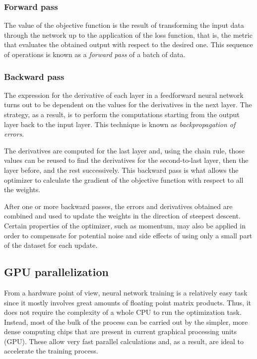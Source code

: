 \subsubsection{Forward pass}

The value of the objective function is the result of transforming the input data through the network up to the application of the loss function, that is, the metric that evaluates the obtained output with respect to the desired one. This sequence of operations is known as a \textit{forward pass} of a batch of data. 


\subsubsection{Backward pass}

The expression for the derivative of each layer in a feedforward neural network turns out to be dependent on the values for the derivatives in the next layer. The strategy, as a result, is to perform the computations starting from the output layer back to the input layer. This technique is known as \textit{backpropagation of errors}. 

The derivatives are computed for the last layer and, using the chain rule, those values can be reused to find the derivatives for the second-to-last layer, then the layer before, and the rest successively. This backward pass is what allows the optimizer to calculate the gradient of the objective function with respect to all the weights. 

After one or more backward passes, the errors and derivatives obtained are combined and used to update the weights in the direction of steepest descent. Certain properties of the optimizer, such as momentum, may also be applied in order to compensate for potential noise and side effects of using only a small part of the dataset for each update.

\subsection{GPU parallelization}

From a hardware point of view, neural network training is a relatively easy task since it mostly involves great amounts of floating point matrix products. Thus, it does not require the complexity of a whole CPU to run the optimization task. Instead, most of the bulk of the process can be carried out by the simpler, more dense computing chips that are present in current graphical processing units (GPU). These allow very fast parallel calculations and, as a result, are ideal to accelerate the training process.

